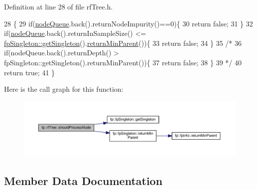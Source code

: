 Definition at line 28 of file rf\+Tree.\+h.


\begin{DoxyCode}
28                                                \{
29                     \textcolor{keywordflow}{if}(\hyperlink{classfp_1_1rfTree_af72d0a2f930fd480dfb4858885c2df23}{nodeQueue}.back().returnNodeImpurity()==0)\{
30                         \textcolor{keywordflow}{return} \textcolor{keyword}{false};
31                     \}
32                     \textcolor{keywordflow}{if}(\hyperlink{classfp_1_1rfTree_af72d0a2f930fd480dfb4858885c2df23}{nodeQueue}.back().returnInSampleSize() <= 
      \hyperlink{classfp_1_1fpSingleton_a8bdae77b68521003e3fc630edec2e240}{fpSingleton::getSingleton}().\hyperlink{classfp_1_1fpSingleton_a2d06406b6462099e0adb393218090420}{returnMinParent}())\{
33                         \textcolor{keywordflow}{return} \textcolor{keyword}{false};
34                     \}
35                     \textcolor{comment}{/*}
36 \textcolor{comment}{                         if(nodeQueue.back().returnDepth() >
       fpSingleton::getSingleton().returnMinParent())\{}
37 \textcolor{comment}{                         return false;}
38 \textcolor{comment}{                         \}}
39 \textcolor{comment}{                         */}
40                     \textcolor{keywordflow}{return} \textcolor{keyword}{true};
41                 \}
\end{DoxyCode}
Here is the call graph for this function\+:
\nopagebreak
\begin{figure}[H]
\begin{center}
\leavevmode
\includegraphics[width=350pt]{classfp_1_1rfTree_a36abf82d31ca57670b09da16525dce0d_cgraph}
\end{center}
\end{figure}


\subsection{Member Data Documentation}
\mbox{\label{classfp_1_1rfTree_a83832650bcea8d63cdcd480d9ddc6e6e}} 
